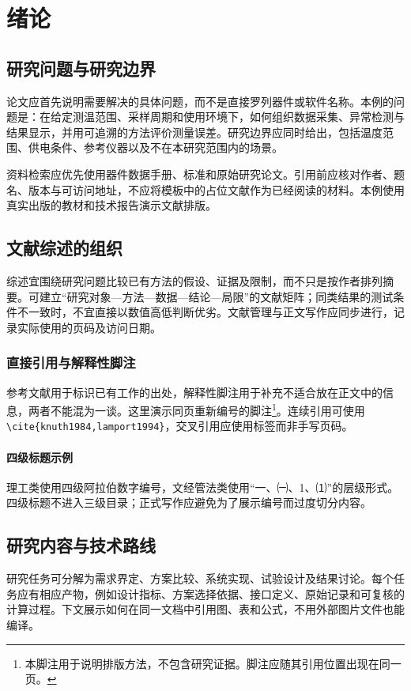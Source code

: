 \section{绪论}
\subsection{研究问题与研究边界}
论文应首先说明需要解决的具体问题，而不是直接罗列器件或软件名称。本例的问题是：在给定测温范围、采样周期和使用环境下，如何组织数据采集、异常检测与结果显示，并用可追溯的方法评价测量误差。研究边界应同时给出，包括温度范围、供电条件、参考仪器以及不在本研究范围内的场景。

资料检索应优先使用器件数据手册、标准和原始研究论文。引用前应核对作者、题名、版本与可访问地址，不应将模板中的占位文献作为已经阅读的材料。本例使用真实出版的教材和技术报告演示文献排版\cite{knuth1984,lamport1994}。
\subsection{文献综述的组织}
综述宜围绕研究问题比较已有方法的假设、证据及限制，而不只是按作者排列摘要。可建立“研究对象—方法—数据—结论—局限”的文献矩阵；同类结果的测试条件不一致时，不宜直接以数值高低判断优劣。文献管理与正文写作应同步进行，记录实际使用的页码及访问日期。
\subsubsection{直接引用与解释性脚注}
参考文献用于标识已有工作的出处，解释性脚注用于补充不适合放在正文中的信息，两者不能混为一谈。这里演示同页重新编号的脚注\footnote{本脚注用于说明排版方法，不包含研究证据。脚注应随其引用位置出现在同一页。}。连续引用可使用 \verb|\cite{knuth1984,lamport1994}|，交叉引用应使用标签而非手写页码。
\paragraph{四级标题示例}
理工类使用四级阿拉伯数字编号，文经管法类使用“一、㈠、1、⑴”的层级形式。四级标题不进入三级目录；正式写作应避免为了展示编号而过度切分内容。
\subsection{研究内容与技术路线}
研究任务可分解为需求界定、方案比较、系统实现、试验设计及结果讨论。每个任务应有相应产物，例如设计指标、方案选择依据、接口定义、原始记录和可复核的计算过程。下文展示如何在同一文档中引用图、表和公式，不用外部图片文件也能编译。

